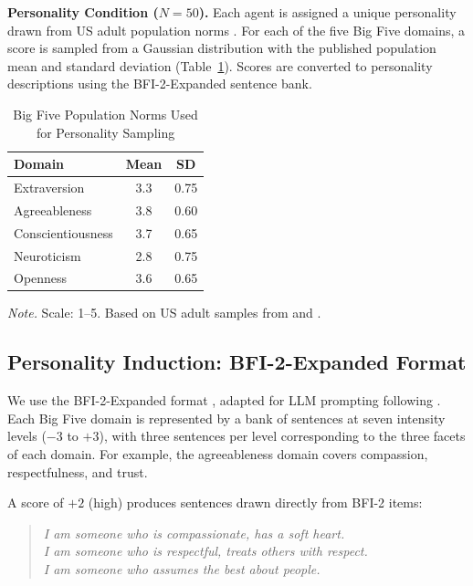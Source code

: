 \documentclass[12pt, a4paper]{article}
\begin{document}
\textbf{Personality Condition ($N = 50$).} Each agent is assigned a unique personality drawn from US adult population norms \citep{soto2017bfi2, srivastava2003development}. For each of the five Big Five domains, a score is sampled from a Gaussian distribution with the published population mean and standard deviation (Table~\ref{tab:norms}). Scores are converted to personality descriptions using the BFI-2-Expanded sentence bank.

\begin{table}[H]
\centering
\caption{Big Five Population Norms Used for Personality Sampling}
\label{tab:norms}
\begin{tabular}{lcc}
\toprule
Domain & Mean & SD \\
\midrule
Extraversion & 3.3 & 0.75 \\
Agreeableness & 3.8 & 0.60 \\
Conscientiousness & 3.7 & 0.65 \\
Neuroticism & 2.8 & 0.75 \\
Openness & 3.6 & 0.65 \\
\bottomrule
\end{tabular}

\medskip
\footnotesize
\textit{Note.} Scale: 1--5. Based on US adult samples from \citet{soto2017bfi2} and \citet{srivastava2003development}.
\end{table}

\subsection{Personality Induction: BFI-2-Expanded Format}

We use the BFI-2-Expanded format \citep{soto2017bfi2}, adapted for LLM prompting following \citet{huang2024designing}. Each Big Five domain is represented by a bank of sentences at seven intensity levels ($-3$ to $+3$), with three sentences per level corresponding to the three facets of each domain. For example, the agreeableness domain covers compassion, respectfulness, and trust.

A score of $+2$ (high) produces sentences drawn directly from BFI-2 items:

\begin{quote}
\emph{I am someone who is compassionate, has a soft heart.} \\
\emph{I am someone who is respectful, treats others with respect.} \\
\emph{I am someone who assumes the best about people.}
\end{quote}
\end{document}
